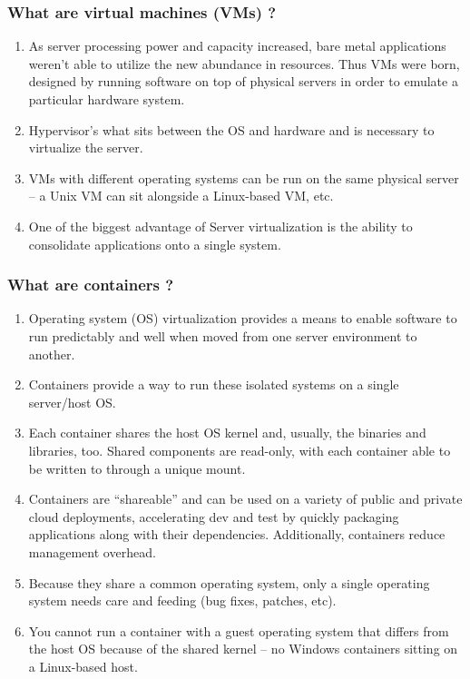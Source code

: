 \documentclass[a4paper,12pt]{article}
\begin{document}
\subsubsection{What are virtual machines (VMs) ?}
\begin{enumerate}
\item As server processing power and capacity increased, bare metal applications weren’t able to utilize the new abundance in resources. Thus VMs were born, designed by running software on top of physical servers in order to emulate a particular hardware system.
\item   Hypervisor’s what sits between the OS and hardware and is necessary to virtualize the server.
\item  VMs with different operating systems can be run on the same physical server – a Unix VM can sit alongside a Linux-based VM, etc. 
\item One of the biggest advantage of Server virtualization is the ability to consolidate applications onto a single system.
\end{enumerate}
\subsubsection{What are containers ?}

\begin{enumerate}
\item Operating system (OS) virtualization provides a means to enable software to run predictably and well when moved from one server environment to another. 
\item Containers provide a way to run these isolated systems on a single server/host OS.
\item Each container shares the host OS kernel and, usually, the binaries and libraries, too. Shared components are read-only, with each container able to be written to through a unique mount. 
\item Containers are “shareable” and can be used on a variety of public and private cloud deployments, accelerating dev and test by quickly packaging applications along with their dependencies. Additionally, containers reduce management overhead. 
\item Because they share a common operating system, only a single operating system needs care and feeding (bug fixes, patches, etc).
\item You cannot run a container with a guest operating system that differs from the host OS because of the shared kernel – no Windows containers sitting on a Linux-based host.
\end{enumerate}
\end{document}
